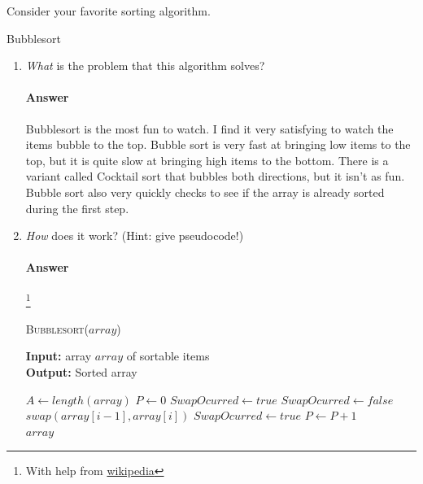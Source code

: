 \documentclass{article}
\begin{document}
\collab{}
Consider your favorite sorting algorithm.

Bubblesort
\begin{enumerate}
      \item \emph{What} is the problem that this algorithm solves?
            
            \paragraph{Answer} Bubblesort is the most fun to watch. I find it very
            satisfying to watch the items bubble to the top.
            Bubble sort is very fast at bringing low items to the top, but it is quite
            slow at bringing high items to the bottom. There is a variant called Cocktail sort
            that bubbles both directions, but it isn't as fun. Bubble sort also very quickly checks
            to see if the array is already sorted during the first step.
            
      \item \emph{How} does it work? (Hint: give pseudocode!)
            
            \paragraph{Answer}
            \footnote{With help from \href{https://en.wikipedia.org/wiki/Bubble_sort}{wikipedia}}
            
            \begin{algorithm}\caption{\textsc{Bubblesort}($array$)}\label{alg:seb}
                  {\bf Input:} array $array$ of sortable items\\
                  {\bf Output:} Sorted array
                  \begin{algorithmic}[1]
                        \State $A \gets length(array)$
                        \State $P \gets 0$
                        \State $SwapOcurred \gets true$
                        \State $SwapOcurred \gets false$
                        \State $swap(array[i-1], array[i])$
                        \State $SwapOcurred \gets true$
                        \EndIf
                        \EndFor
                        \State $ P \gets P + 1$
                        \EndWhile\\ 
                        \Return $array$
                  \end{algorithmic}
            \end{algorithm}
            

\end{enumerate}
\end{document}
